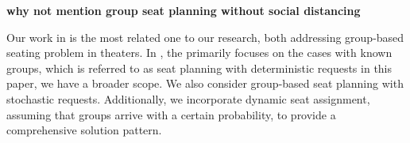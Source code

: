 {\bf{why not mention group seat planning without social distancing}}


Our work in \cite{blom2022filling} is the most related one to our research, both addressing group-based seating problem in theaters. In \cite{blom2022filling}, the primarily focuses on the cases with known groups, which is referred to as seat planning with deterministic requests in this paper, we have a broader scope. We also consider group-based seat planning with stochastic requests. Additionally, we incorporate dynamic seat assignment, assuming that groups arrive with a certain probability, to provide a comprehensive solution pattern.







